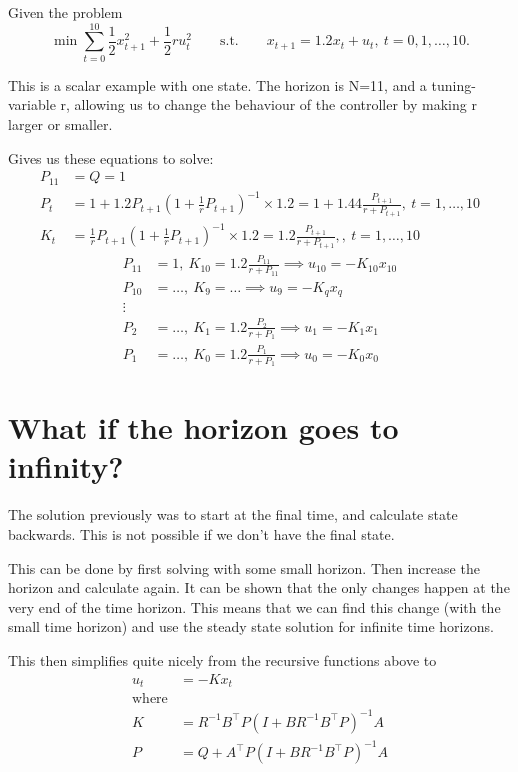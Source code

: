 \documentclass{article}
\begin{document}
Given the problem 
\[
  \min \sum_{t=0}^{10} \frac{1}{2} x_{t+1}^2 + \frac{1}{2}r u_t^2 \qquad\text{s.t.}\qquad x_{t+1} = 1.2x_t + u_t,\  t=0,1,\dots,10
.\] 

This is a scalar example with one state. The horizon is N=11, and a tuning-variable r, allowing us to change the behaviour of the controller by making r larger or smaller.  

Gives us these equations to solve:
\begin{align*}
  P_{11} &= Q = 1 \\ 
  P_t &= 1 + 1.2P_{t+1}(1+ \frac{1}{r}P_{t+1})^{-1} \times 1.2 = 1 + 1.44 \frac{P_{t+1}}{r+P_{t+1}} ,\ t=1,\dots,10 \\ 
  K_t &= \frac{1}{r}P_{t+1}(1+ \frac{1}{r}P_{t+1})^{-1}\times 1.2 = 1.2 \frac{P_{t+1}}{r+P_{t+1}} , ,\ t=1,\dots,10
\end{align*}
\begin{align*}
  P_{11} &= 1,\  K_{10} = 1.2 \frac{P_{11}}{r+P_{11}} \implies u_{10} = -K_{10}x_{10} \\ 
  P_{10} & = \dots ,\ K_9 = \dots \implies u_9 = -K_q x_q \\ 
  \vdots & \\ 
  P_2 &= \dots,\  K_1 = 1.2 \frac{P_2}{r+P_1} \implies u_1 = -K_1 x_1 \\ 
  P_1 &= \dots ,\ K_0 = 1.2 \frac{P_1}{r+P_1} \implies u_0 = -K_0 x_0
\end{align*}

\section{What if the horizon goes to infinity?}

The solution previously was to start at the final time, and calculate state backwards. This is not possible if we don't have the final state. 

This can be done by first solving with some small horizon. Then increase the horizon and calculate again. It can be shown that the only 
changes happen at the very end of the time horizon. This means that we can find this change (with the small time horizon) and use the steady state solution for infinite 
time horizons. 

This then simplifies quite nicely from the recursive functions above to
\begin{align*}
  u_t &= -Kx_t \\ 
  \text{where} &  \\ 
  K &= R^{-1}B^{\top}P(I + BR^{-1}B^{\top}P)^{-1}A \\ 
  P &= Q + A^{\top}P(I + BR^{-1}B^{\top}P)^{-1}A
\end{align*}
\end{document}
